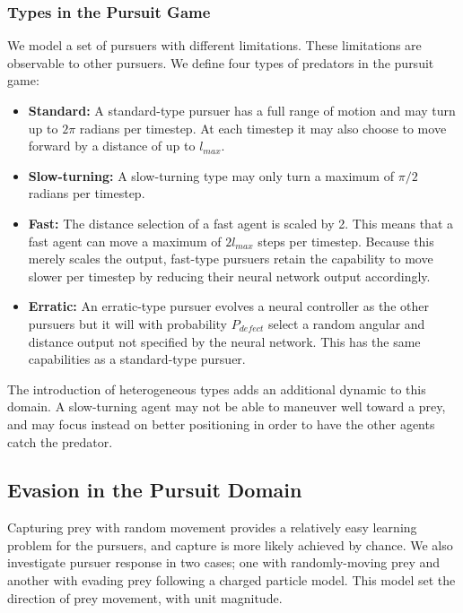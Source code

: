 \documentclass{aamas2014}
\begin{document}
\subsubsection{Types in the Pursuit Game}

We model a set of pursuers with different limitations. These limitations are observable to other pursuers. We define four types of predators in the pursuit game:

\begin{itemize}
\item \textbf{Standard:} A standard-type pursuer has a full range of motion and may turn up to $2\pi$ radians per timestep. At each timestep it may also choose to move forward by a distance of up to $l_{max}$.

\item \textbf{Slow-turning:} A slow-turning type may only turn a maximum of $\pi/2$ radians per timestep. 

\item \textbf{Fast:} The distance selection of a fast agent is scaled by 2. This means that a fast agent can move a maximum of $2 l_{max}$ steps per timestep. Because this merely scales the output, fast-type pursuers retain the capability to move slower per timestep by reducing their neural network output accordingly.

\item \textbf{Erratic:} An erratic-type pursuer evolves a neural controller as the other pursuers but it will with probability $P_{defect}$ select a random angular and distance output not specified by the neural network. This has the same capabilities as a standard-type pursuer.


\end{itemize}

The introduction of heterogeneous types adds an additional dynamic to this domain. A slow-turning agent may not be able to maneuver well toward a prey, and may focus instead on better positioning in order to have the other agents catch the predator.


\subsection{Evasion in the Pursuit Domain}

Capturing prey with random movement provides a relatively easy learning problem for the pursuers, and capture is more likely achieved by chance. We also investigate pursuer response in two cases; one with randomly-moving prey and another with evading prey following a charged particle model. This model set the direction of prey movement, with unit magnitude.
\end{document}
